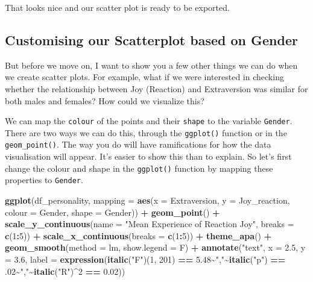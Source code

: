 \documentclass[
]{book}
\newenvironment{Shaded}{\begin{snugshade}}{\end{snugshade}}
\newcommand{\AttributeTok}[1]{\textcolor[rgb]{0.13,0.29,0.53}{#1}}
\newcommand{\DecValTok}[1]{\textcolor[rgb]{0.00,0.00,0.81}{#1}}
\newcommand{\FloatTok}[1]{\textcolor[rgb]{0.00,0.00,0.81}{#1}}
\newcommand{\FunctionTok}[1]{\textcolor[rgb]{0.13,0.29,0.53}{\textbf{#1}}}
\newcommand{\NormalTok}[1]{#1}
\newcommand{\SpecialCharTok}[1]{\textcolor[rgb]{0.81,0.36,0.00}{\textbf{#1}}}
\newcommand{\StringTok}[1]{\textcolor[rgb]{0.31,0.60,0.02}{#1}}
\begin{document}
That looks nice and our scatter plot is ready to be exported.

\subsection{Customising our Scatterplot based on Gender}\label{customising-our-scatterplot-based-on-gender}

But before we move on, I want to show you a few other things we can do when we create scatter plots. For example, what if we were interested in checking whether the relationship between Joy (Reaction) and Extraversion was similar for both males and females? How could we visualize this?

We can map the \texttt{colour} of the points and their \texttt{shape} to the variable \texttt{Gender}. There are two ways we can do this, through the \texttt{ggplot()} function or in the \texttt{geom\_point()}. The way you do will have ramifications for how the data visualisation will appear. It's easier to show this than to explain. So let's first change the colour and shape in the \texttt{ggplot()} function by mapping these properties to \texttt{Gender}.

\begin{Shaded}
\begin{Highlighting}[]
\FunctionTok{ggplot}\NormalTok{(df\_personality, }\AttributeTok{mapping =} \FunctionTok{aes}\NormalTok{(}\AttributeTok{x =}\NormalTok{ Extraversion, }\AttributeTok{y =}\NormalTok{ Joy\_reaction, }\AttributeTok{colour =}\NormalTok{ Gender, }\AttributeTok{shape =}\NormalTok{ Gender)) }\SpecialCharTok{+}
  \FunctionTok{geom\_point}\NormalTok{() }\SpecialCharTok{+}
  \FunctionTok{scale\_y\_continuous}\NormalTok{(}\AttributeTok{name =} \StringTok{"Mean Experience of Reaction Joy"}\NormalTok{, }\AttributeTok{breaks =} \FunctionTok{c}\NormalTok{(}\DecValTok{1}\SpecialCharTok{:}\DecValTok{5}\NormalTok{)) }\SpecialCharTok{+}
  \FunctionTok{scale\_x\_continuous}\NormalTok{(}\AttributeTok{breaks =} \FunctionTok{c}\NormalTok{(}\DecValTok{1}\SpecialCharTok{:}\DecValTok{5}\NormalTok{)) }\SpecialCharTok{+}
  \FunctionTok{theme\_apa}\NormalTok{() }\SpecialCharTok{+}
  \FunctionTok{geom\_smooth}\NormalTok{(}\AttributeTok{method =}\NormalTok{ lm, }\AttributeTok{show.legend =}\NormalTok{ F) }\SpecialCharTok{+}
  \FunctionTok{annotate}\NormalTok{(}\StringTok{"text"}\NormalTok{, }\AttributeTok{x =} \FloatTok{2.5}\NormalTok{, }\AttributeTok{y =} \FloatTok{3.6}\NormalTok{,}
           \AttributeTok{label =} \FunctionTok{expression}\NormalTok{(}\FunctionTok{italic}\NormalTok{(}\StringTok{"F"}\NormalTok{)(}\DecValTok{1}\NormalTok{, }\DecValTok{201}\NormalTok{) }\SpecialCharTok{==} \FloatTok{5.48}\SpecialCharTok{\textasciitilde{}}\StringTok{","}\SpecialCharTok{\textasciitilde{}}\FunctionTok{italic}\NormalTok{(}\StringTok{"p"}\NormalTok{) }\SpecialCharTok{==}\NormalTok{ .}\DecValTok{02}\SpecialCharTok{\textasciitilde{}}\StringTok{","}\SpecialCharTok{\textasciitilde{}}\FunctionTok{italic}\NormalTok{(}\StringTok{"R"}\NormalTok{)}\SpecialCharTok{\^{}}\DecValTok{2} \SpecialCharTok{==} \FloatTok{0.02}\NormalTok{))}
\end{Highlighting}
\end{Shaded}
\end{document}
